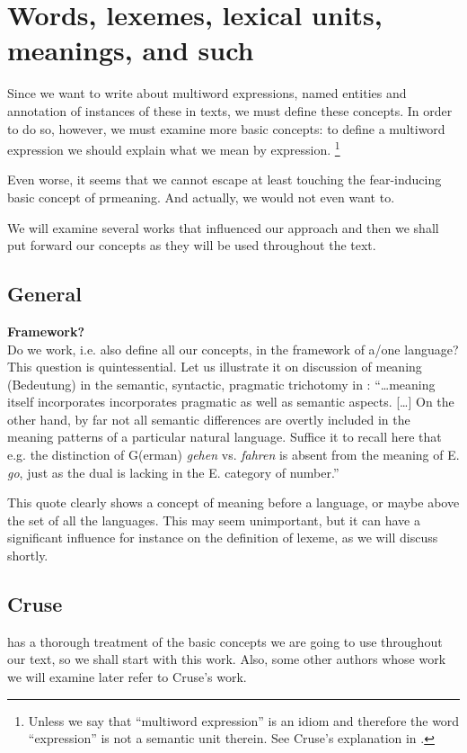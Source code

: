 
\chapter{Words, lexemes, lexical units, meanings, and such}
Since we want to write about multiword expressions, named entities and annotation of instances of these in texts, we must define these concepts. In order to do so, however, we must examine more basic concepts: to define a multiword expression we should explain what we mean by expression. %
\footnote{Unless we say that ``multiword expression'' is an idiom and therefore the word ``expression'' is not a semantic unit therein. See Cruse's explanation in .
} %

Even worse, it seems  that we cannot escape at least touching the fear-inducing basic concept of pr{meaning}. And actually, we would not even want to. 

We will examine several works that influenced our approach and then we shall put forward our concepts as they will be used throughout the text.

\section{General}
\textbf{Framework?}\\
Do we work, i.e. also define all our concepts, in the framework of a/one language? This question is quintessential. Let us illustrate it on discussion of meaning (Bedeutung) in the semantic, syntactic, pragmatic trichotomy in \citet{sgall-etal:1986}: ``\ldots meaning itself incorporates incorporates pragmatic as well as semantic aspects. [\ldots] On the other hand, by far not all semantic differences are overtly included in the meaning patterns of a particular natural language. Suffice it to recall here that e.g. the distinction of G(erman) \emph{gehen} vs. \emph{fahren} is absent from the meaning of E. \emph{go}, just as the dual is lacking in the E. category of number.''

This quote clearly shows a concept of meaning before a language, or maybe above the set of all the languages. This may seem unimportant, but it can have a significant influence for instance on the definition of lexeme, as we will discuss shortly.   

\section{Cruse}
\label{rel:cruse}
\citetext{D. A. Cruse in his book \emph{Lexical Semantics}, \citeyear{cruse:1986}} has a thorough treatment of the basic concepts we are going to use throughout our text, so we shall start with this work. Also, some other authors whose work we will examine later refer to Cruse's work. 

